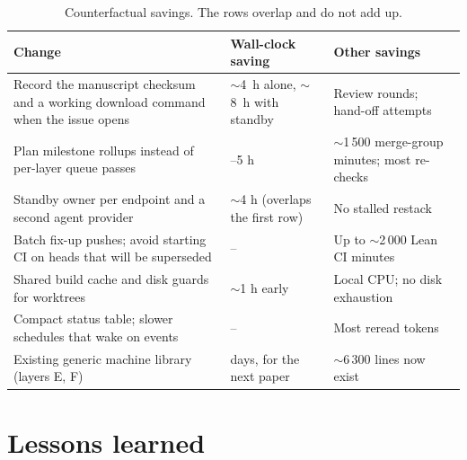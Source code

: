 \documentclass[11pt]{article}
\begin{document}
\begin{table}[!htbp]
\centering\small
\begin{tabularx}{\textwidth}{@{}L>{\raggedright\arraybackslash}p{2.6cm}>{\raggedright\arraybackslash}p{3.6cm}@{}}
\toprule
Change & Wall-clock saving & Other savings\\
\midrule
Record the manuscript checksum and a working download command when the issue opens & ${\sim}$4~h alone, ${\sim}$8~h with standby & Review rounds; hand-off attempts\\
Plan milestone rollups instead of per-layer queue passes & 3--5 h & ${\sim}$1\,500 merge-group minutes; most re-checks\\
Standby owner per endpoint and a second agent provider & ${\sim}$4 h (overlaps the first row) & No stalled restack\\
Batch fix-up pushes; avoid starting CI on heads that will be superseded & -- & Up to ${\sim}$2\,000 Lean CI minutes\\
Shared build cache and disk guards for worktrees & ${\sim}$1 h early & Local CPU; no disk exhaustion\\
Compact status table; slower schedules that wake on events & -- & Most reread tokens\\
Existing generic machine library (layers E, F) & days, for the next paper & ${\sim}$6\,300 lines now exist\\
\bottomrule
\end{tabularx}
\caption{Counterfactual savings. The rows overlap and do not add up.}
\label{tab:faster}
\end{table}

\section{Lessons learned}
\label{sec:lessons}
\end{document}
